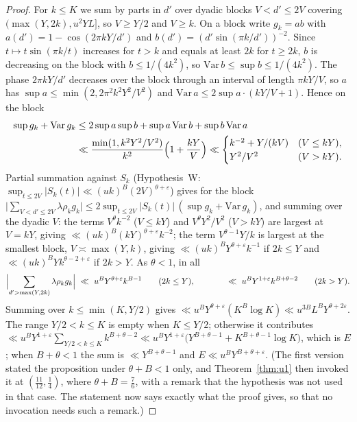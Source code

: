 \documentclass[11pt,a4paper]{article}
\theoremstyle{remark}\newtheorem{remark}[theorem]{Remark}
\begin{document}
\begin{proof}
For $k\le K$ we sum by parts in $d'$ over dyadic blocks $V<d'\le2V$ covering $(\max(Y,2k),u^2YL]$, so $V\ge Y/2$ and
$V\ge k$. On a block write $g_k=ab$ with $a(d')=1-\cos(2\pi kY/d')$ and $b(d')=(d'\sin(\pi k/d'))^{-2}$. Since
$t\mapsto t\sin(\pi k/t)$ increases for $t>k$ and equals at least $2k$ for $t\ge2k$, $b$ is decreasing on the block with
$b\le1/(4k^2)$, so $\mathrm{Var}\,b\le\sup b\le1/(4k^2)$. The phase $2\pi kY/d'$ decreases over the block through an
interval of length $\pi kY/V$, so $a$ has $\sup a\le\min(2,2\pi^2k^2Y^2/V^2)$ and $\mathrm{Var}\,a\le2\sup a\cdot(kY/V+1)$. Hence on the block
\[
\begin{aligned}
\sup g_k+\mathrm{Var}\,g_k&\le 2\sup a\sup b+\sup a\,\mathrm{Var}\,b+\sup b\,\mathrm{Var}\,a\\
&\ll\frac{\min(1,k^2Y^2/V^2)}{k^2}\Bigl(1+\frac{kY}V\Bigr)
\ll\begin{cases}k^{-2}+Y/(kV)&(V\le kY),\\ Y^2/V^2&(V>kY).\end{cases}
\end{aligned}
\]
Partial summation against $S_k$ (Hypothesis~W: $\sup_{t\le2V}|S_k(t)|\ll(uk)^B(2V)^{\theta+\varepsilon}$) gives for the block
$\bigl|\sum_{V<d'\le2V}\lambda\rho_kg_k\bigr|\le2\sup_{t\le2V}|S_k(t)|\,(\sup g_k+\mathrm{Var}\,g_k)$, and summing over the
dyadic $V$: the terms $V^{\theta}k^{-2}$ ($V\le kY$) and $V^{\theta}Y^2/V^2$ ($V>kY$) are largest at $V=kY$, giving
$\ll(uk)^B(kY)^{\theta+\varepsilon}k^{-2}$; the term $V^{\theta-1}Y/k$ is largest at the smallest block, $V\asymp\max(Y,k)$, giving
$\ll(uk)^BY^{\theta+\varepsilon}k^{-1}$ if $2k\le Y$ and $\ll(uk)^BYk^{\theta-2+\varepsilon}$ if $2k>Y$. As $\theta<1$, in all
\[
\Bigl|\sum_{d'>\max(Y,2k)}\lambda\rho_kg_k\Bigr|\ \ll\ u^BY^{\theta+\varepsilon}k^{B-1}\qquad(2k\le Y),\qquad\qquad
\ll\ u^BY^{1+\varepsilon}k^{B+\theta-2}\qquad(2k>Y).
\]
Summing over $k\le\min(K,Y/2)$ gives $\ll u^BY^{\theta+\varepsilon}(K^B\log K)\ll u^{3B}L^BY^{\theta+2\varepsilon}$. The range
$Y/2<k\le K$ is empty when $K\le Y/2$; otherwise it contributes
$\ll u^BY^{1+\varepsilon}\sum_{Y/2<k\le K}k^{B+\theta-2}\ll u^BY^{1+\varepsilon}\bigl(Y^{B+\theta-1}+K^{B+\theta-1}\log K\bigr)$, which
is $E$; when $B+\theta<1$ the sum is $\ll Y^{B+\theta-1}$ and $E\ll u^BY^{B+\theta+\varepsilon}$. (The first version stated the
proposition under $\theta+B<1$ only, and Theorem~\ref{thm:u1} then invoked it at $(\tfrac{11}{12},\tfrac14)$, where
$\theta+B=\tfrac76$, with a remark that the hypothesis was not used in that case. The statement now says exactly what
the proof gives, so that no invocation needs such a remark.)
\end{proof}
\end{document}
